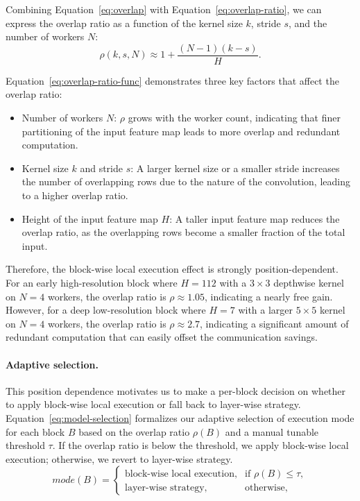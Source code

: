Combining Equation~\eqref{eq:overlap} with Equation~\eqref{eq:overlap-ratio}, we can express the overlap ratio as a function of the kernel size $k$, stride $s$, and the number of workers $N$:
\begin{equation}
    \rho(k, s, N) \approx 1 + \frac{(N-1)(k - s)}{H}.
    \label{eq:overlap-ratio-func}
\end{equation}

Equation~\eqref{eq:overlap-ratio-func} demonstrates three key factors that affect the overlap ratio: 
\begin{itemize}
    \item Number of workers $N$: $\rho$ grows with the worker count, indicating that finer partitioning of the input feature map leads to more overlap and redundant computation.
    \item Kernel size $k$ and stride $s$: A larger kernel size or a smaller stride increases the number of overlapping rows due to the nature of the convolution, leading to a higher overlap ratio.
    \item Height of the input feature map $H$: A taller input feature map reduces the overlap ratio, as the overlapping rows become a smaller fraction of the total input.
\end{itemize}

Therefore, the block-wise local execution effect is strongly position-dependent. For an early high-resolution block where $H=112$ with a $3\times3$ depthwise kernel on $N=4$ workers, the overlap ratio is $\rho\approx 1.05$, indicating a nearly free gain. However, for a deep low-resolution block where $H=7$ with a larger $5\times5$ kernel on $N=4$ workers, the overlap ratio is $\rho\approx 2.7$, indicating a significant amount of redundant computation that can easily offset the communication savings.

\paragraph{Adaptive selection.}
This position dependence motivates us to make a per-block decision on whether to apply block-wise local execution or fall back to layer-wise strategy. Equation~\eqref{eq:model-selection} formalizes our adaptive selection of execution mode for each block $B$ based on the overlap ratio $\rho(B)$ and a manual tunable threshold $\tau$. If the overlap ratio is below the threshold, we apply block-wise local execution; otherwise, we revert to layer-wise strategy. 
\begin{equation}
    mode(B) = \begin{cases}
        \text{block-wise local execution}, & \text{if } \rho(B) \leq \tau, \\
        \text{layer-wise strategy}, & \text{otherwise},
    \end{cases}
    \label{eq:model-selection}
\end{equation}

